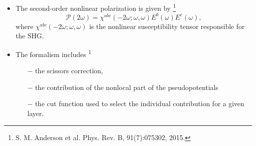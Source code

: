 \documentclass{beamer}
\begin{document}
\begin{frame}


{\small

\begin{itemize}

\item 
The second-order nonlinear polarization is given by
\footnote[frame]{\tiny S. M. Anderson et al. Phys. Rev. B, 91(7):075302, 2015.}
\begin{equation*}\label{eq:pol}
\mathcal{P}(2\omega) = 
\chi^{abc}(-2\omega;\omega,\omega)E^{b}(\omega)E^{c}(\omega),
\end{equation*} 
where $\chi^{abc}(-2\omega;\omega,\omega)$ is the nonlinear susceptibility
tensor responsible for the SHG.

\item 
The formalism includes\textsuperscript{ 1}
\begin{itemize}
\item [$-$] the scissors correction,
\item [$-$] the contribution of the nonlocal part of the pseudopotentials
\item [$-$] the cut function used to select the individual contribution for
a given layer.
\end{itemize}

\end{itemize}
}
\end{frame}

\end{document}
